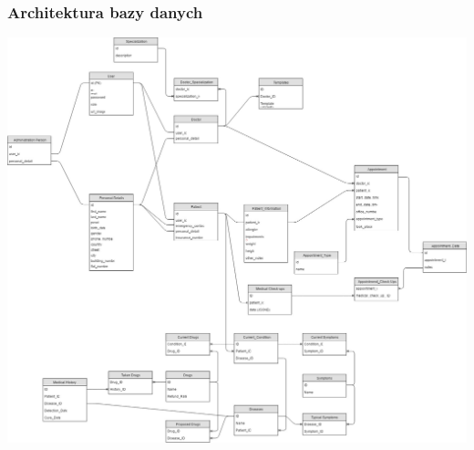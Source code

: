 \documentclass[polish,12pt]{aghthesis}
\begin{document}
\subsubsection{Architektura bazy danych}
\includegraphics[width=\textwidth]{db-schema}
\end{document}
